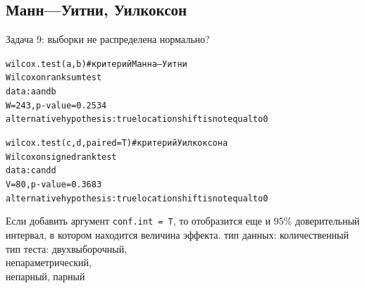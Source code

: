 \subsection{Манн—Уитни, Уилкоксон}
\begin{frame}{Задача 9: выборки не распределена нормально?}
\scriptsize
\begin{alltt}
\alert{wilcox.test(a, b)} \hfill \# критерий Манна—Уитни\medskip\\
Wilcoxon rank sum test\\
data:  a and b\\
W = 243, p-value = 0.2534
alternative hypothesis: true location shift is not equal to 0
\end{alltt}
\normalsize
\vfill
\scriptsize
\begin{alltt}
\alert{wilcox.test(c,d, paired = T)}\hfill \# критерий Уилкоксона\medskip\\
Wilcoxon signed rank test\\
data:  c and d\\
\alert{V = 80, p-value = 0.3683}\\
alternative hypothesis: true location shift is not equal to 0
\end{alltt}
\normalsize
\vfill
Если добавить аргумент \scriptsize\verb"conf.int = T"\normalsize, то отобразится еще и  95\% доверительный интервал, в котором находится величина эффекта.
\vfill
тип данных: количественный\\
тип теста: двухвыборочный,\\
непараметрический,\\
непарный, парный\\
\end{frame}
